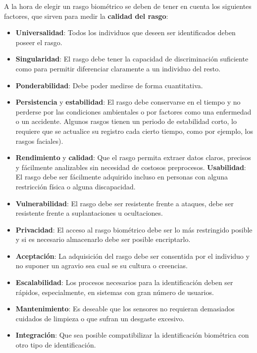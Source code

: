 A la hora de elegir un rasgo biométrico se deben de tener en cuenta los siguientes factores, que sirven para medir la \textbf{calidad del rasgo}: 

\begin{itemize}
    \item
    \textbf{Universalidad}: Todos los individuos que deseen ser identificados deben poseer el rasgo.
    \item
    \textbf{Singularidad}: El rasgo debe tener la capacidad de discriminación suficiente como para permitir diferenciar claramente a un individuo del resto.
    \item
    \textbf{Ponderabilidad}: Debe poder medirse de forma cuantitativa.
    \item
    \textbf{Persistencia} y \textbf{estabilidad}: El rasgo debe conservarse en el tiempo y no perderse por las condiciones ambientales o por factores como una enfermedad o un accidente. Algunos rasgos tienen un periodo de estabilidad corto, lo requiere que se actualice su registro cada cierto tiempo, como por ejemplo, los rasgos faciales).
    \item
    \textbf{Rendimiento} y \textbf{calidad}: Que el rasgo permita extraer datos claros, precisos y fácilmente analizables sin necesidad de costosos preprocesos.
    \textbf{Usabilidad}: El rasgo debe ser fácilmente adquirido incluso en personas con alguna restricción física o alguna discapacidad.
    \item
    \textbf{Vulnerabilidad}: El rasgo debe ser resistente frente a ataques, debe ser resistente frente a suplantaciones u ocultaciones.
    \item
    \textbf{Privacidad}: El acceso al rasgo biométrico debe ser lo más restringido posible y si es necesario almacenarlo debe ser posible encriptarlo.
    \item
    \textbf{Aceptación}: La adquisición del rasgo debe ser consentida por el individuo y no suponer un agravio sea cual se su cultura o creencias.   
    \item
    \textbf{Escalabilidad}: Los procesos necesarios para la identificación deben ser rápidos, especialmente, en sistemas con gran número de usuarios.
    \item
    \textbf{Mantenimiento}: Es deseable que los sensores no requieran demasiados cuidados de limpieza o que sufran un desgaste excesivo. 
    \item
    \textbf{Integración}: Que sea posible compatibilizar la identificación biométrica con otro tipo de identificación.
\end{itemize}


